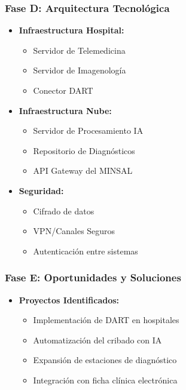 \subsubsection{Fase D: Arquitectura Tecnológica}
\begin{itemize}
\item \textbf{Infraestructura Hospital:}
  \begin{itemize}
    \item Servidor de Telemedicina
    \item Servidor de Imagenología
    \item Conector DART
  \end{itemize}
\item \textbf{Infraestructura Nube:}
  \begin{itemize}
    \item Servidor de Procesamiento IA
    \item Repositorio de Diagnósticos
    \item API Gateway del MINSAL
  \end{itemize}
\item \textbf{Seguridad:}
  \begin{itemize}
    \item Cifrado de datos
    \item VPN/Canales Seguros
    \item Autenticación entre sistemas
  \end{itemize}
\end{itemize}

\subsubsection{Fase E: Oportunidades y Soluciones}
\begin{itemize}
\item \textbf{Proyectos Identificados:}
  \begin{itemize}
    \item Implementación de DART en hospitales
    \item Automatización del cribado con IA
    \item Expansión de estaciones de diagnóstico
    \item Integración con ficha clínica electrónica
  \end{itemize}
\end{itemize}

